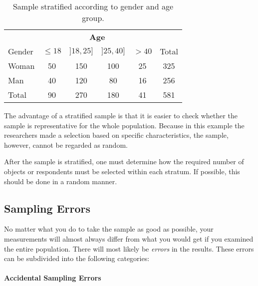 \begin{table}
    \centering
    \begin{tabular}{l|cccc|c}
        & \multicolumn{4}{c|}{\textbf{Age}} & \\
        Gender & $\le 18$ & $]18,25]$ & $]25, 40]$ & $> 40$ & Total\\
        \hline
        Woman & 50 & 150 & 100 & 25 & 325 \\
        Man   & 40 & 120 & 80 & 16 & 256\\
        \hline
        Total & 90 & 270 & 180 & 41 & 581
    \end{tabular}
    \caption{Sample stratified according to gender and age group.}
    \label{tab:frequenties-steekproef}
\end{table}

The advantage of a stratified sample is that it is easier to check whether the sample is representative for the whole population. 
Because in this example the researchers made a selection based on specific characteristics, the sample, however, cannot be regarded as random.

After the sample is stratified, one must determine how the required number of objects or respondents must be selected within each stratum. If possible, this should be done in a random manner.



\subsection{Sampling Errors}

No matter what you do to take the sample as good as possible, your measurements will almost always differ from what you would get if you examined the entire population. There will most likely be \emph{errors} in the results. These errors can be subdivided into the following categories:


\paragraph{Accidental Sampling Errors}

